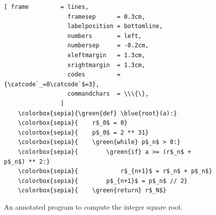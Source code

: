 \begin{figure}[!h]
\centering
\begin{Verbatim}[ frame         = lines, 
                  framesep      = 0.3cm, 
                  labelposition = bottomline,
                  numbers       = left,
                  numbersep     = -0.2cm,
                  xleftmargin   = 1.3cm,
                  xrightmargin  = 1.3cm,
                  codes         = {\catcode`_=8\catcode`$=3},
                  commandchars  = \\\{\},
                ]
    \colorbox{sepia}{\green{def} \blue{root}(a):}
    \colorbox{sepia}{    r$_0$ = 0}
    \colorbox{sepia}{    p$_0$ = 2 ** 31}
    \colorbox{sepia}{    \green{while} p$_n$ > 0:}
    \colorbox{sepia}{        \green{if} a >= (r$_n$ + p$_n$) ** 2:}
    \colorbox{sepia}{            r$_{n+1}$ = r$_n$ + p$_n$}
    \colorbox{sepia}{        p$_{n+1}$ = p$_n$ // 2}
    \colorbox{sepia}{    \green{return} r$_N$}
\end{Verbatim}
\vspace*{-0.3cm}
\caption{An annotated program to compute the integer square root.}
\label{fig:Integer-Square-Root-Iterative.ipynb}
\end{figure} %

